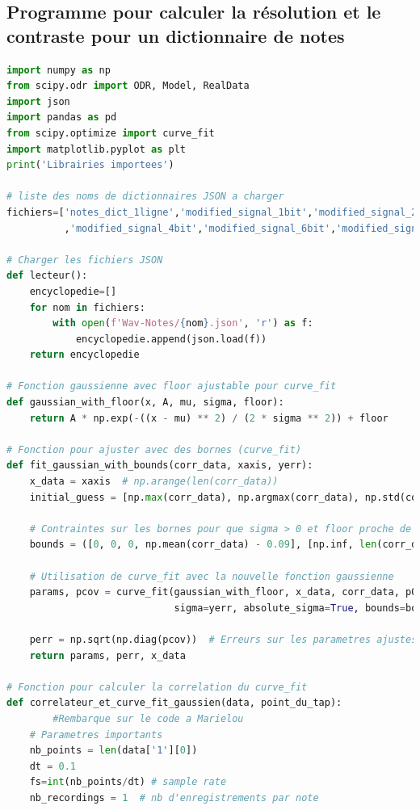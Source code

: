 ﻿\documentclass[11pt,letterpaper]{article}
\begin{document}
\subsection{Programme pour calculer la résolution et le contraste pour un dictionnaire de notes}

\begin{lstlisting}[language=python]
import numpy as np
from scipy.odr import ODR, Model, RealData
import json
import pandas as pd
from scipy.optimize import curve_fit
import matplotlib.pyplot as plt
print('Librairies importees')

# liste des noms de dictionnaires JSON a charger
fichiers=['notes_dict_1ligne','modified_signal_1bit','modified_signal_2bit','modified_signal_3bit'
          ,'modified_signal_4bit','modified_signal_6bit','modified_signal_8bit','modified_signal_16bit']

# Charger les fichiers JSON
def lecteur():
    encyclopedie=[]
    for nom in fichiers:
        with open(f'Wav-Notes/{nom}.json', 'r') as f:
            encyclopedie.append(json.load(f))
    return encyclopedie 

# Fonction gaussienne avec floor ajustable pour curve_fit
def gaussian_with_floor(x, A, mu, sigma, floor):
    return A * np.exp(-((x - mu) ** 2) / (2 * sigma ** 2)) + floor

# Fonction pour ajuster avec des bornes (curve_fit)
def fit_gaussian_with_bounds(corr_data, xaxis, yerr):
    x_data = xaxis  # np.arange(len(corr_data))
    initial_guess = [np.max(corr_data), np.argmax(corr_data), np.std(corr_data), np.mean(corr_data)]  # [amplitude, mean, sigma, offset]

    # Contraintes sur les bornes pour que sigma > 0 et floor proche de la moyenne des donnees
    bounds = ([0, 0, 0, np.mean(corr_data) - 0.09], [np.inf, len(corr_data), np.inf, np.mean(corr_data) + 0.09])

    # Utilisation de curve_fit avec la nouvelle fonction gaussienne
    params, pcov = curve_fit(gaussian_with_floor, x_data, corr_data, p0=initial_guess,
                             sigma=yerr, absolute_sigma=True, bounds=bounds, maxfev=10000)

    perr = np.sqrt(np.diag(pcov))  # Erreurs sur les parametres ajustes
    return params, perr, x_data

# Fonction pour calculer la correlation du curve_fit
def correlateur_et_curve_fit_gaussien(data, point_du_tap):
        #Rembarque sur le code a Marielou
    # Parametres importants
    nb_points = len(data['1'][0])  
    dt = 0.1
    fs=int(nb_points/dt) # sample rate
    nb_recordings = 1  # nb d'enregistrements par note


\end{lstlisting}
\end{document}
